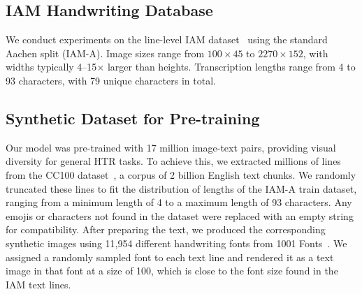\documentclass[times, review, 10pt]{elsarticle}
\begin{document}
\subsection{IAM Handwriting Database}
\label{sec:dataset-iam}
We conduct experiments on the line-level IAM dataset~\cite{Marti2002IAM} using the standard Aachen split (IAM-A).
Image sizes range from \(100 \times 45\) to \(2270 \times 152\), with widths typically 4--15$\times$ larger than heights.
Transcription lengths range from 4 to 93 characters, with 79 unique characters in total.
\subsection{Synthetic Dataset for Pre-training}
\label{sec:dataset-synth}

Our model was pre-trained with 17 million image-text pairs, providing visual diversity for general HTR tasks.
To achieve this, we extracted millions of lines from the CC100 dataset~\cite{cc100}, a corpus of 2 billion English text chunks.
We randomly truncated these lines to fit the distribution of lengths of the IAM-A train dataset, ranging from a minimum length of 4 to a maximum length of 93 characters.
Any emojis or characters not found in the dataset were replaced with an empty string for compatibility.
After preparing the text,  we produced the corresponding synthetic images using 11,954 different handwriting fonts from 1001 Fonts~\cite{1001fonts}.
We assigned a randomly sampled font to each text line and rendered it as a text image in that font at a size of 100, which is close to the font size found in the IAM text lines. 
\end{document}
